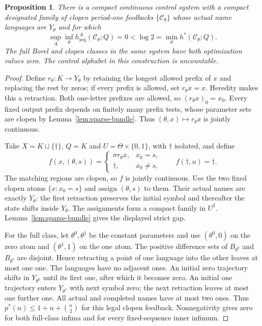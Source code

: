 \documentclass[11pt,reqno]{amsart}
\numberwithin{equation}{section}
\newtheorem{proposition}[theorem]{Proposition}
\theoremstyle{definition}
\newcommand{\C}{\mathcal C}
\newcommand{\hseq}{h_{\mathrm{seq}}}
\newcommand{\hpat}{h^{*}}
\begin{document}
\begin{proposition}\label{prop:compact-family}
There is a compact continuous control system with a compact
designated family of clopen period-one feedbacks $\{\C_\theta\}$
whose actual name languages are $Y_\theta$ and for which
\[
 \sup_A\inf_\theta\hseq^A(\C_\theta;Q)
 =0<\log2=\min_\theta\hpat(\C_\theta;Q).
\]
The full Borel and clopen classes in the same system have both
optimization values zero. The control alphabet in this construction
is uncountable.
\end{proposition}
\begin{proof}
Define $r_\theta:K\to Y_\theta$ by retaining the longest allowed
prefix of $x$ and replacing the rest by zeros; if every prefix
is allowed, set $r_\theta x=x$. Heredity makes this a retraction.
Both one-letter prefixes are allowed, so $(r_\theta x)_0=x_0$.
Every fixed output prefix depends on finitely many prefix tests,
whose parameter sets are clopen by Lemma~\ref{lem:sparse-bundle}.
Thus $(\theta,x)\mapsto r_\theta x$ is jointly continuous.

Take $X=K\sqcup\{\dagger\}$, $Q=K$ and
$U=\Theta\times\{0,1\}$, with $\dagger$ isolated, and define
\[
 f(x,(\theta,s))=
 \begin{cases}\sigma r_\theta x,&x_0=s,\\
 \dagger,&x_0\ne s,\end{cases}
 \qquad f(\dagger,u)=\dagger.
\]
The matching regions are clopen, so $f$ is jointly continuous.
Use the two fixed clopen atoms $\{x:x_0=s\}$ and assign
$(\theta,s)$ to them. Their actual names are exactly $Y_\theta$:
the first retraction preserves the initial symbol and thereafter
the state shifts inside $Y_\theta$. The assignments form a
compact family in $U^2$. Lemma~\ref{lem:sparse-bundle} gives the
displayed strict gap.

For the full class, let $\theta^0,\theta^1$ be the constant
parameters and use $(\theta^0,0)$ on the zero atom and
$(\theta^1,1)$ on the one atom. The positive difference sets of
$B_{\theta^0}$ and $B_{\theta^1}$ are disjoint. Hence retracting
a point of one language into the other leaves at most one one.
The languages have no adjacent ones. An initial zero trajectory
shifts in $Y_{\theta^0}$ until its first one, after which it
becomes zero. An initial one trajectory enters $Y_{\theta^1}$
with next symbol zero; the next retraction leaves at most one
further one. All actual and completed names have at most two ones.
Thus $p^*(n)\le1+n+\binom n2$ for this legal clopen feedback.
Nonnegativity gives zero for both full-class infima and for
every fixed-sequence inner infimum.
\end{proof}
\end{document}
